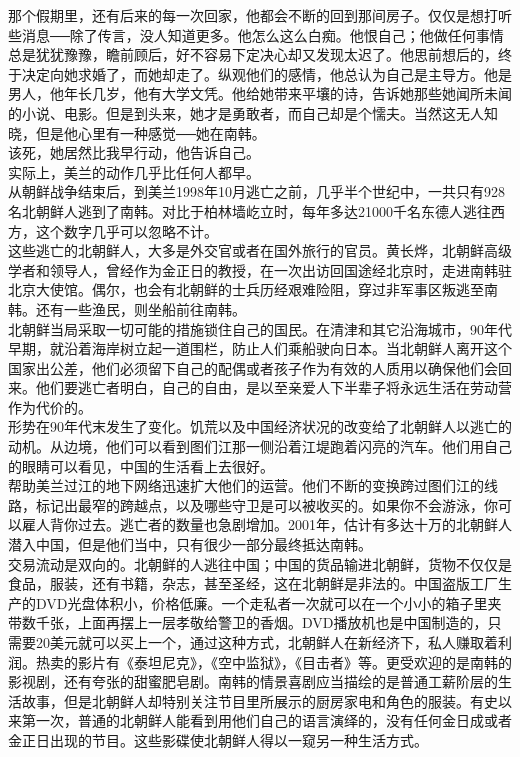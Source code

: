 那个假期里，还有后来的每一次回家，他都会不断的回到那间房子。仅仅是想打听些消息──除了传言，没人知道更多。他怎么这么白痴。他恨自己；他做任何事情总是犹犹豫豫，瞻前顾后，好不容易下定决心却又发现太迟了。他思前想后的，终于决定向她求婚了，而她却走了。纵观他们的感情，他总认为自己是主导方。他是男人，他年长几岁，他有大学文凭。他给她带来平壤的诗，告诉她那些她闻所未闻的小说、电影。但是到头来，她才是勇敢者，而自己却是个懦夫。当然这无人知晓，但是他心里有一种感觉──她在南韩。\\

该死，她居然比我早行动，他告诉自己。\\

实际上，美兰的动作几乎比任何人都早。\\

从朝鲜战争结束后，到美兰1998年10月逃亡之前，几乎半个世纪中，一共只有928名北朝鲜人逃到了南韩。对比于柏林墙屹立时，每年多达21000千名东德人逃往西方，这个数字几乎可以忽略不计。\\

这些逃亡的北朝鲜人，大多是外交官或者在国外旅行的官员。黄长烨，北朝鲜高级学者和领导人，曾经作为金正日的教授，在一次出访回国途经北京时，走进南韩驻北京大使馆。偶尔，也会有北朝鲜的士兵历经艰难险阻，穿过非军事区叛逃至南韩。还有一些渔民，则坐船前往南韩。\\

北朝鲜当局采取一切可能的措施锁住自己的国民。在清津和其它沿海城市，90年代早期，就沿着海岸树立起一道围栏，防止人们乘船驶向日本。当北朝鲜人离开这个国家出公差，他们必须留下自己的配偶或者孩子作为有效的人质用以确保他们会回来。他们要逃亡者明白，自己的自由，是以至亲爱人下半辈子将永远生活在劳动营作为代价的。\\

形势在90年代末发生了变化。饥荒以及中国经济状况的改变给了北朝鲜人以逃亡的动机。从边境，他们可以看到图们江那一侧沿着江堤跑着闪亮的汽车。他们用自己的眼睛可以看见，中国的生活看上去很好。\\

帮助美兰过江的地下网络迅速扩大他们的运营。他们不断的变换跨过图们江的线路，标记出最窄的跨越点，以及哪些守卫是可以被收买的。如果你不会游泳，你可以雇人背你过去。逃亡者的数量也急剧增加。2001年，估计有多达十万的北朝鲜人潜入中国，但是他们当中，只有很少一部分最终抵达南韩。\\

交易流动是双向的。北朝鲜的人逃往中国；中国的货品输进北朝鲜，货物不仅仅是食品，服装，还有书籍，杂志，甚至圣经，这在北朝鲜是非法的。中国盗版工厂生产的DVD光盘体积小，价格低廉。一个走私者一次就可以在一个小小的箱子里夹带数千张，上面再摆上一层孝敬给警卫的香烟。DVD播放机也是中国制造的，只需要20美元就可以买上一个，通过这种方式，北朝鲜人在新经济下，私人赚取着利润。热卖的影片有《泰坦尼克》，《空中监狱》，《目击者》等。更受欢迎的是南韩的影视剧，还有夸张的甜蜜肥皂剧。南韩的情景喜剧应当描绘的是普通工薪阶层的生活故事，但是北朝鲜人却特别关注节目里所展示的厨房家电和角色的服装。有史以来第一次，普通的北朝鲜人能看到用他们自己的语言演绎的，没有任何金日成或者金正日出现的节目。这些影碟使北朝鲜人得以一窥另一种生活方式。\\

